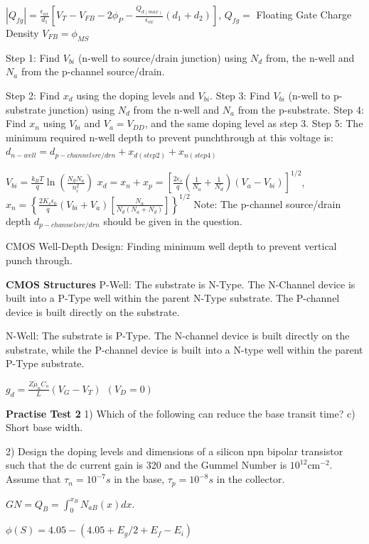 \begin{multicols}{3}
$|Q_{fg}|=\frac{\epsilon_{ox}}{d_1}\left[V_T-V_{FB}-2\phi_P-\frac{Q_{d(max)}}{\epsilon_{ox}}(d_1+d_2)\right]$, $Q_{fg}=$ Floating Gate Charge Density $V_{FB}=\phi_{MS}$

Step 1: Find $V_{bi}$ (n-well to source/drain junction) using $N_d$ from, the n-well and $N_a$ from the p-channel source/drain.
\vspace*{-0.4cm}
\begin{flushright}
Step 2: Find $x_d$ using the doping levels and $V_{bi}$. \break 
Step 3: Find $V_{bi}$ (n-well to p-substrate junction) using $N_d$ from the n-well and $N_a$ from the p-substrate. \break 
Step 4: Find $x_n$ using $V_{bi}$ and $V_a=V_{DD}$, and the same doping level as step 3. \break 
Step 5: The minimum required n-well depth to prevent punchthrough at this voltage is: $d_{n-well}=d_{p-channel src/drn}+x_{d(step 2)}+ x_{n(step 4)}$
\end{flushright}
$V_{bi}=\frac{k_BT}{q}\ln\left(\frac{N_dN_a}{n_i^2}\right)$ \hfill \break 
$x_d=x_n+x_p=\left[\frac{2\epsilon_s}{q} \left(\frac{1}{N_a}+\frac{1}{N_d}\right)(V_a-V_{bi})\right]^{1/2}$, \hfill \break 
$x_n= \left\{\frac{2K_s\epsilon_0}{q}(V_{bi}+V_a)\left[\frac{N_a}{N_d(N_a+N_d)}\right]\right\}^{1/2}$
Note: The p-channel source/drain depth $d_{p-channel src/drn}$ should be given in the question. 

CMOS Well-Depth Design: Finding minimum well
depth to prevent vertical punch through.


\textbf{CMOS Structures}
P-Well: The substrate is N-Type. The N-Channel device is built into a P-Type well within the parent N-Type substrate.
The P-channel device is built directly on the substrate. 

N-Well: The substrate is P-Type. The N-channel device is built directly on the substrate, while the P-channel device is
built into a N-type well within the parent P-Type substrate. 

$g_d=\frac{Z\bar{\mu}_n C_o}{L}(V_G-V_T) \ \ (V_D=0)$

\textbf{Practise Test 2}
1) Which of the following can reduce the base transit time? c) Short base width.

2) Design the doping levels and dimensions of a silicon npn bipolar transistor such that the dc current gain is 320 and the Gummel Number is $10^{12} \text{cm}^{-2}$. Assume that $\tau_n=10^{-7} s$ in the base, $\tau_p=10^{-8}s$ in the collector.

$GN = Q_B = \int_0^{x_B}N_{aB} (x) dx$. 

$\phi(S) = 4.05 - (4.05+E_g/2+E_f-E_i)$
\end{multicols}
\newpage


